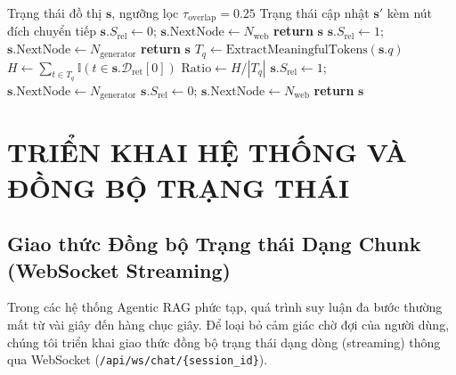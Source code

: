 \documentclass[conference]{IEEEtran}
\begin{document}
\begin{algorithm}[htbp]
\caption{Đánh giá Ngữ cảnh Hai Pha và Định tuyến Dự phòng}
\label{alg:grader}
\begin{algorithmic}[1]
\Require Trạng thái đồ thị $\mathbf{s}$, ngưỡng lọc $\tau_{\text{overlap}} = 0.25$
\Ensure Trạng thái cập nhật $\mathbf{s}'$ kèm nút đích chuyển tiếp
        \State $\mathbf{s}.S_{\text{rel}} \leftarrow 0$; $\mathbf{s}.\text{NextNode} \leftarrow N_{\text{web}}$
        \State \textbf{return} $\mathbf{s}$
    \EndIf
        \State $\mathbf{s}.S_{\text{rel}} \leftarrow 1$; $\mathbf{s}.\text{NextNode} \leftarrow N_{\text{generator}}$
        \State \textbf{return} $\mathbf{s}$ 
    \EndIf
    \State $T_q \leftarrow \text{ExtractMeaningfulTokens}(\mathbf{s}.q)$
    \State $H \leftarrow \sum_{t \in T_q} \mathbb{I}(t \in \mathbf{s}.\mathcal{D}_{\text{ret}}[0])$ 
    \State $\text{Ratio} \leftarrow H / |T_q|$
        \State $\mathbf{s}.S_{\text{rel}} \leftarrow 1$; $\mathbf{s}.\text{NextNode} \leftarrow N_{\text{generator}}$
    \Else
        \State $\mathbf{s}.S_{\text{rel}} \leftarrow 0$; $\mathbf{s}.\text{NextNode} \leftarrow N_{\text{web}}$
    \EndIf
    \State \textbf{return} $\mathbf{s}$
\EndFunction
\end{algorithmic}
\end{algorithm}

\section{TRIỂN KHAI HỆ THỐNG VÀ ĐỒNG BỘ TRẠNG THÁI}

\subsection{Giao thức Đồng bộ Trạng thái Dạng Chunk (WebSocket Streaming)}
Trong các hệ thống Agentic RAG phức tạp, quá trình suy luận đa bước thường mất từ vài giây đến hàng chục giây. Để loại bỏ cảm giác chờ đợi của người dùng, chúng tôi triển khai giao thức đồng bộ trạng thái dạng dòng (streaming) thông qua WebSocket (\texttt{/api/ws/chat/\{session\_id\}}).
\end{document}
